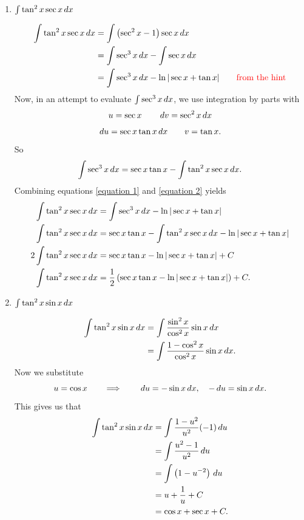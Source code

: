 \documentclass[handout]{ximera}
\begin{document}
\begin{problem}
\begin{enumerate}
	\item  $\int \tan^2 x \sec x \,d x$ 
	\begin{freeResponse}
		\begin{align}
		\int \tan^2 x \sec x \,d x
		&= \int \left( \sec^2 x - 1 \right) \sec x \,d x  \nonumber	\\
		&= \int \sec^3 x \,d x - \int \sec x \,d x  		\nonumber	\\
		&= \int \sec^3 x \,d x - \ln | \sec x + \tan x| 	\qquad	{\color{red}\text{from the hint}}	\label{equation 1}
		\end{align}
	Now, in an attempt to evaluate $\int \sec^3 x \,d x$, we use integration by parts with
		{\color{red}
		\[
		u = \sec x 				\qquad	\,d v = \sec^2 x \,d x
		\]
		\[
		\,d u = \sec x \tan x \,d x	\qquad	v = \tan x.
		\]
		}
	So
		\begin{equation}\label{equation 2}
		\int \sec^3 x \,d x = \sec x \tan x - \int \tan^2 x \sec x \,d x.
		\end{equation}
	Combining equations \eqref{equation 1} and \eqref{equation 2} yields
		\begin{align*}
		\int \tan^2 x \sec x \,d x &= \int \sec^3 x \,d x - \ln | \sec x + \tan x|   \\
		\int \tan^2 x \sec x \,d x &= \sec x \tan x - \int \tan^2 x \sec x \,d x - \ln | \sec x + \tan x |  \\
		2 \int \tan^2 x \sec x \,d x &= \sec x \tan x - \ln | \sec x + \tan x | + C  \\
		\int \tan^2 x \sec x \,d x &= \frac{1}{2} \left( \sec x \tan x - \ln | \sec x + \tan x | \right) + C.
		\end{align*}
	\end{freeResponse}
	
	
	
	\item  $\int \tan^2 x \sin x \,d x$
	\begin{freeResponse}
		\begin{align*}
		\int \tan^2 x \sin x \,d x
		&= \int \frac{\sin^2 x}{\cos^2 x} \sin x \,d x  \\
		&= \int \frac{1-\cos^2 x}{\cos^2 x} \sin x \,d x.
		\end{align*}
	Now we substitute
		{\color{red}
		\[
		u = \cos x 		\qquad	\Longrightarrow		\qquad	\,d u = - \sin x \,d x, \quad - \,d u = \sin x \,d x.
		\]
		}
	This gives us that
		\begin{align*}
		\int \tan^2 x \sin x \,d x
		&= \int \frac{1-u^2}{u^2} (-1) \,d u  \\
		&= \int \frac{u^2 - 1}{u^2} \,d u  \\
		&= \int \left( 1 - u^{-2} \right) \,d u  \\
		&= u + \frac{1}{u} + C  \\
		&= \cos x + \sec x + C.
		\end{align*}
	\end{freeResponse}
	
	\end{enumerate}
	
\end{problem}
\end{document}
